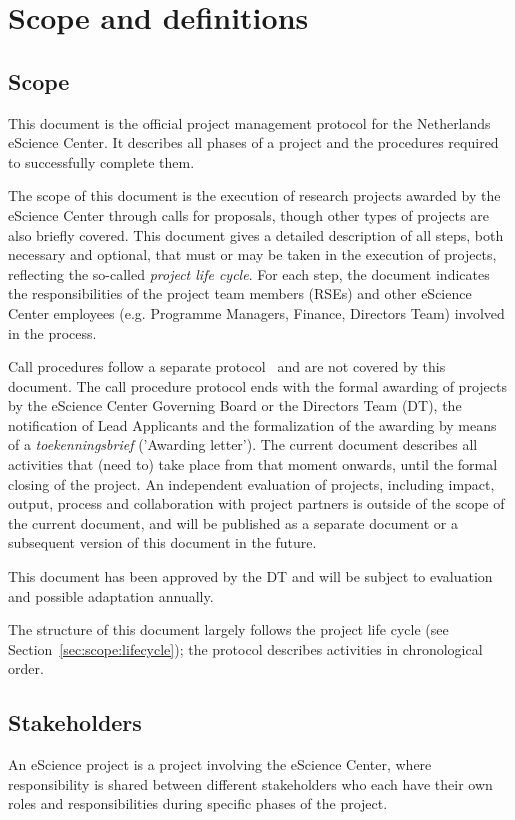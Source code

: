 \section{Scope and definitions}
\label{sec:scope}

\subsection{Scope}

This document is the official project management protocol for the Netherlands eScience Center. It describes all phases
of a project and the procedures required to successfully complete them.

The scope of this document is the execution of research projects awarded by the eScience Center through calls for
proposals, though other types of projects are also briefly covered. This document gives a detailed description of all
steps, both necessary and optional, that must or may be taken in the execution of projects, reflecting the so-called
\textit{project life cycle}. For each step, the document indicates the responsibilities of the project team members
(RSEs) and other eScience Center employees (e.g. Programme Managers, Finance, Directors Team) involved in the
process.

Call procedures follow a separate protocol~\cite{call-protocol-2015} and are
not covered by this document. The call procedure protocol ends with the formal awarding of projects by the eScience
Center Governing Board or the Directors Team (DT), the notification of Lead Applicants and the formalization of the
awarding by means of a \textit{toekenningsbrief} ('Awarding letter’). The
current document describes all activities that (need to) take place from that moment onwards, until the formal closing
of the project. An independent evaluation of projects, including impact, output, process and collaboration with project
partners is outside of the scope of the current document, and will be published as a separate document or a subsequent
version of this document in the future. 

This document has been approved by the DT and will be subject to evaluation and possible adaptation annually.

The structure of this document largely follows the project life cycle (see Section~\ref{sec:scope:lifecycle}); the
protocol describes activities in chronological order.

\subsection{Stakeholders}
An eScience project is a project involving the eScience Center, where responsibility is shared between different
stakeholders who each have their own roles and responsibilities during specific phases of the project.


